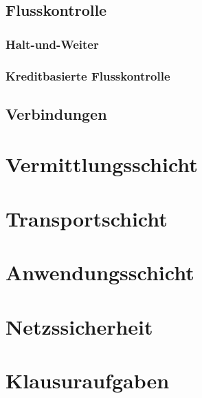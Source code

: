 \documentclass[a4paper, 14pt]{article}
\begin{document}
	\subsection{Flusskontrolle}

	\subsubsection{Halt-und-Weiter}

	\subsubsection{Kreditbasierte Flusskontrolle}

	\subsection{Verbindungen}

	\section{Vermittlungsschicht}

	\section{Transportschicht}

	\section{Anwendungsschicht}

	\section{Netzssicherheit}

	\section{Klausuraufgaben}
\end{document}
